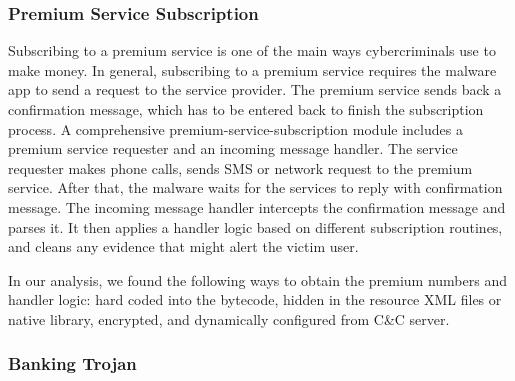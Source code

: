 \subsubsection{Premium Service Subscription}
\label{sec:profile:monetize:premium}

Subscribing to a premium service is one of the main ways
cybercriminals use to make money.
In general, subscribing to a premium service
requires the malware app to send a request to the service provider.
The premium service sends back a confirmation
message, which has to be entered back
to finish the subscription process.
A comprehensive premium-service-subscription module includes
a premium service requester and an incoming message handler.
The service requester makes phone calls, sends SMS or network request to the premium service.
After that, the malware waits for the services to reply with confirmation message.
The incoming message handler intercepts the confirmation message and
parses it. It then applies a handler logic
based on different subscription routines,
and cleans any evidence that might alert the victim user.

In our analysis, we found the following ways to obtain the premium numbers
and handler logic: hard coded into the bytecode,
hidden in the resource XML files or native library,
encrypted, and dynamically configured from C\&C server.


\subsubsection{Banking Trojan}
\label{sec:profile:monetize:bank}

